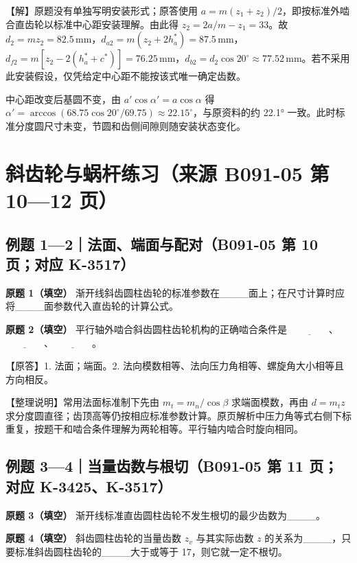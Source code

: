 \documentclass[zihao=5,a4paper,UTF8,fontset=fandol]{ctexart}
\begin{document}
【解】原题没有单独写明安装形式；原答使用 $a=m(z_1+z_2)/2$，即按标准外啮合直齿轮以标准中心距安装理解。由此得 $z_2=2a/m-z_1=33$。故 $d_2=mz_2=82.5\,\mathrm{mm}$，$d_{a2}=m(z_2+2h_a^*)=87.5\,\mathrm{mm}$，$d_{f2}=m[z_2-2(h_a^*+c^*)]=76.25\,\mathrm{mm}$，$d_{b2}=d_2\cos20^\circ\approx77.52\,\mathrm{mm}$。若不采用此安装假设，仅凭给定中心距不能按该式唯一确定齿数。


中心距改变后基圆不变，由 $a'\cos\alpha'=a\cos\alpha$ 得 $\alpha'=\arccos(68.75\cos20^\circ/69.75)\approx22.15^\circ$，与原资料的约 22.1° 一致。此时标准分度圆尺寸未变，节圆和齿侧间隙则随安装状态变化。




\section{斜齿轮与蜗杆练习（来源 B091-05 第 10—12 页）}

\subsection{例题 1—2｜法面、端面与配对（B091-05 第 10 页；对应 K-3517）}

\textbf{原题 1（填空）} 渐开线斜齿圆柱齿轮的标准参数在\_\_\_\_面上；在尺寸计算时应将\_\_\_\_面参数代入直齿轮的计算公式。


\textbf{原题 2（填空）} 平行轴外啮合斜齿圆柱齿轮机构的正确啮合条件是 $\underline{\qquad\qquad}$、$\underline{\qquad\qquad}$、$\underline{\qquad\qquad}$。


【原答】1. 法面；端面。2. 法向模数相等、法向压力角相等、螺旋角大小相等且方向相反。


【整理说明】常用法面标准制下先由 $m_t=m_n/\cos\beta$ 求端面模数，再由 $d=m_tz$ 求分度圆直径；齿顶高等仍按相应标准参数计算。原页解析中压力角等式右侧下标重复，按题干和啮合条件理解为两轮相等。平行轴内啮合时旋向相同。




\subsection{例题 3—4｜当量齿数与根切（B091-05 第 11 页；对应 K-3425、K-3517）}

\textbf{原题 3（填空）} 渐开线标准直齿圆柱齿轮不发生根切的最少齿数为\_\_\_\_。


\textbf{原题 4（填空）} 斜齿圆柱齿轮的当量齿数 $z_v$ 与其实际齿数 $z$ 的关系为\_\_\_\_，只要标准斜齿圆柱齿轮的\_\_\_\_大于或等于 17，则它就一定不根切。
\end{document}

